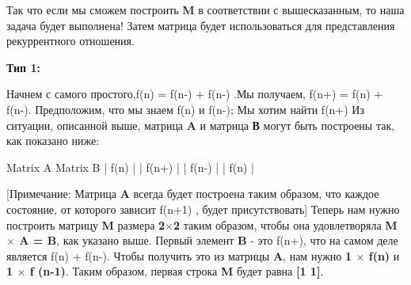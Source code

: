 Так что если мы сможем построить \textbf{M} в соответствии с вышесказанным, то наша задача будет выполнена! Затем матрица будет использоваться для представления рекуррентного отношения.

\vspace{\baselineskip}
\textbf{Тип 1:}


Начнем с самого простого,f(n) = f(n-) + f(n-) .\newline Мы получаем, f(n+) = f(n) + f(n-).\newline
Предположим, что мы знаем f(n) и f(n-); Мы хотим найти f(n+)\newline
Из ситуации, описанной выше, матрица \textbf{A} и матрица \textbf{В} могут быть построены так, как показано ниже:

\vspace{\baselineskip}
\begin{tcolorbox}
\hspace{3,5mm} Matrix A \hspace{20mm}Matrix B \newline
\hspace*{3mm}|\hspace{5mm}  f(n)  \hspace*{5mm}|  \hspace*{13mm} |\hspace*{2mm} f(n+)\hspace*{2mm} |\newline
\hspace*{3mm}|\hspace*{3mm} f(n-)\hspace*{3,5mm} |  \hspace*{13mm} |\hspace*{4mm}  f(n) \hspace{4mm}  |
\end{tcolorbox}

\vspace{\baselineskip}
[Примечание: Матрица \textbf{A} всегда будет построена таким образом, что каждое состояние, от которого зависит f(n+1) , будет присутствовать]
Теперь нам нужно построить матрицу \textbf{M} размера \textbf{2$\times$2} таким образом, чтобы она удовлетворяла \textbf{M $\times$ A = B}, как указано выше.\newline
Первый элемент \textbf{B} - это f(n+), что на самом деле является f(n) + f(n-). Чтобы получить это из матрицы \textbf{A}, нам нужно \textbf{1 $\times$ f(n)} и \textbf{1 $\times$ f (n-1)}. Таким образом, первая строка \textbf{M} будет равна \textbf{[1 1]}.

